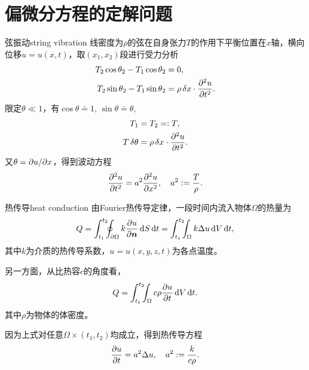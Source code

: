 \def\coursename{数理方程}
\def\coursefullname{数理方程与特殊函数}
\def\courseEnglishname{Mathematical Equations and Special Functions}
\def\teachername{姚国武}
\def\beginday{2022/2/24}
\def\endday{2022/6/16}




\newcommand*{\Ct}{\varTheta}
\newcommand*{\Dif}{\mathcal D}
\newcommand*{\Par}{\mathcal P}
\newcommand*{\even}{\mathrm e}
\newcommand*{\odd}{\mathrm o}
\newcommand*{\sine}{\mathrm s}
\newcommand*{\cosi}{\mathrm c}
\newcommand*{\Cooo}{\mathscr D}
\newcommand*{\Schwsp}{\mathscr S}
\DeclareMathOperator{\FS}{FS}


\firstandforemost

\section{偏微分方程的定解问题}
\begin{example}{弦振动}{string vibration}
	线密度为$\rho$的弦在自身张力$T$的作用下平衡位置在$x$轴，横向位移$u=u(x,t)$，取$(x_1,x_2)$段进行受力分析
	\begin{align*}
		T_2\cos\theta_2-T_1\cos\theta_2&=0,\\
		T_2\sin\theta_2-T_1\sin\theta_2&=\rho\mathop{}\!\delta x\cdot\frac{\partial^{2}u}{\partial t^{2}}.
	\end{align*}
	限定$\theta\ll 1$，有$\cos\theta\doteq 1,\,\sin\theta\doteq\theta,$
	\begin{align*}
		T_1&=T_2=:T,\\
		T\mathop{}\!\delta\theta&=\rho\mathop{}\!\delta x\cdot\frac{\partial^{2}u}{\partial t^{2}}.
	\end{align*}
	又$\theta=\partial u/\partial x$，得到波动方程
	\begin{align}
		\frac{\partial^{2}u}{\partial t^{2}}=a^2\frac{\partial^{2}u}{\partial x^{2}},\quad a^2:=\frac T\rho.
	\end{align}
\end{example}
\begin{example}{热传导}{heat conduction}
	由Fourier热传导定律，一段时间内流入物体$\Omega$的热量为
	\[
		Q=\int_{t_1}^{t_2}\bs5\oint_{\p\Omega}k\pv u{\bm n}\d S\d t=\int_{t_1}^{t_2}\bs5\int_\Omega k\lap u\d V\d t,
	\]
	其中$k$为介质的热传导系数，$u=u(x,y,z,t)$为各点温度。
	
	另一方面，从比热容$c$的角度看，
	\[
		Q=\int_{t_1}^{t_2}\bs5\int_\Omega c\rho\pv ut\d V\d t.
	\]
	其中$\rho$为物体的体密度。
	
	因为上式对任意$\Omega\times(t_1,t_2)$均成立，得到热传导方程
	\begin{align}
		\frac{\partial^{\;\!\!}u}{\partial t^{\;\!\!}}=a^2\Delta u,\quad a^2:=\frac k{c\rho}.
	\end{align}
\end{example}
